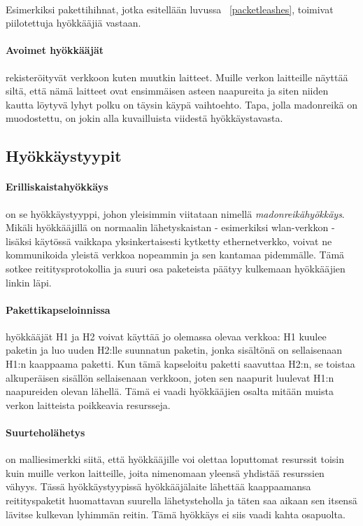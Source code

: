 \documentclass[finnish]{tktltiki2}
\theoremstyle{definition}
\theoremstyle{remark}
\begin{document}
\noindent \\
Esimerkiksi pakettihihnat, jotka esitellään luvussa ~\ref{packetleashes}, toimivat piilotettuja hyökkääjiä vastaan.

\paragraph{Avoimet hyökkääjät} rekisteröityvät verkkoon kuten muutkin laitteet. Muille verkon laitteille näyttää siltä, että nämä laitteet ovat ensimmäisen asteen naapureita ja siten niiden kautta löytyvä lyhyt polku on täysin käypä vaihtoehto. Tapa, jolla madonreikä on muodostettu, on jokin alla kuvailluista viidestä hyökkäystavasta.

\subsection{Hyökkäystyypit}

\paragraph{Erilliskaistahyökkäys} on se hyökkäystyyppi, johon yleisimmin viitataan nimellä \emph{madonreikähyökkäys}. Mikäli hyökkääjillä on normaalin lähetyskaistan - esimerkiksi wlan-verkkon - lisäksi käytössä vaikkapa yksinkertaisesti kytketty ethernetverkko, voivat ne kommunikoida yleistä verkkoa nopeammin ja sen kantamaa pidemmälle. Tämä sotkee reititysprotokollia ja suuri osa paketeista päätyy kulkemaan hyökkääjien linkin läpi.

\paragraph{Pakettikapseloinnissa} hyökkääjät H1 ja H2 voivat käyttää jo olemassa olevaa verkkoa: H1 kuulee paketin ja luo uuden H2:lle suunnatun paketin, jonka sisältönä on sellaisenaan H1:n kaappaama paketti. Kun tämä kapseloitu paketti saavuttaa H2:n, se toistaa alkuperäisen sisällön sellaisenaan verkkoon, joten sen naapurit luulevat H1:n naapureiden olevan lähellä. Tämä ei vaadi hyökkääjien osalta mitään muista verkon laitteista poikkeavia resursseja.

\paragraph{Suurteholähetys} on malliesimerkki siitä, että hyökkääjille voi olettaa loputtomat resurssit toisin kuin muille verkon laitteille, joita nimenomaan yleensä yhdistää resurssien vähyys. Tässä hyökkäystyypissä hyökkääjälaite lähettää kaappaamansa reitityspaketit huomattavan suurella lähetysteholla ja täten saa aikaan sen itsensä lävitse kulkevan lyhimmän reitin. Tämä hyökkäys ei siis vaadi kahta osapuolta.
\end{document}
